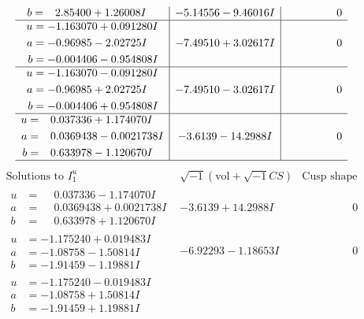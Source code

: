 \documentclass[1p]{elsarticle_modified}
\theoremstyle{definition}
\newcommand{\I}{\sqrt{-1}}
\begin{document}
$$\begin{array}{c|c|c}
\begin{aligned}
b &= \phantom{-}2.85400 + 1.26008 I\end{aligned}
 & -5.14556 - 9.46016 I & \phantom{-0.000000 } 0 \\ \hline\begin{aligned}
u &= -1.163070 + 0.091280 I \\
a &= -0.96985 - 2.02725 I \\
b &= -0.004406 - 0.954808 I\end{aligned}
 & -7.49510 + 3.02617 I & \phantom{-0.000000 } 0 \\ \hline\begin{aligned}
u &= -1.163070 - 0.091280 I \\
a &= -0.96985 + 2.02725 I \\
b &= -0.004406 + 0.954808 I\end{aligned}
 & -7.49510 - 3.02617 I & \phantom{-0.000000 } 0 \\ \hline\begin{aligned}
u &= \phantom{-}0.037336 + 1.174070 I \\
a &= \phantom{-}0.0369438 - 0.0021738 I \\
b &= \phantom{-}0.633978 - 1.120670 I\end{aligned}
 & -3.6139 - 14.2988 I & \phantom{-0.000000 } 0\\
 \hline 
 \end{array}$$\newpage$$\begin{array}{c|c|c}  
\text{Solutions to }I^u_{1}& \I (\text{vol} + \sqrt{-1}CS) & \text{Cusp shape}\\
 \hline 
\begin{aligned}
u &= \phantom{-}0.037336 - 1.174070 I \\
a &= \phantom{-}0.0369438 + 0.0021738 I \\
b &= \phantom{-}0.633978 + 1.120670 I\end{aligned}
 & -3.6139 + 14.2988 I & \phantom{-0.000000 } 0 \\ \hline\begin{aligned}
u &= -1.175240 + 0.019483 I \\
a &= -1.08758 - 1.50814 I \\
b &= -1.91459 - 1.19881 I\end{aligned}
 & -6.92293 - 1.18653 I & \phantom{-0.000000 } 0 \\ \hline\begin{aligned}
u &= -1.175240 - 0.019483 I \\
a &= -1.08758 + 1.50814 I \\
b &= -1.91459 + 1.19881 I\end{aligned}

\end{array}$$
\end{document}
